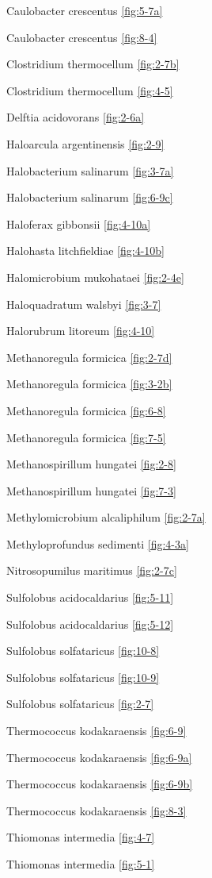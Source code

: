 \documentclass[]{tufte-book}
\begin{document}
Caulobacter crescentus \ref{fig:5-7a}

Caulobacter crescentus \ref{fig:8-4}

Clostridium thermocellum \ref{fig:2-7b}

Clostridium thermocellum \ref{fig:4-5}

Delftia acidovorans \ref{fig:2-6a}

Haloarcula argentinensis \ref{fig:2-9}

Halobacterium salinarum \ref{fig:3-7a}

Halobacterium salinarum \ref{fig:6-9c}

Haloferax gibbonsii \ref{fig:4-10a}

Halohasta litchfieldiae \ref{fig:4-10b}

Halomicrobium mukohataei \ref{fig:2-4e}

Haloquadratum walsbyi \ref{fig:3-7}

Halorubrum litoreum \ref{fig:4-10}

Methanoregula formicica \ref{fig:2-7d}

Methanoregula formicica \ref{fig:3-2b}

Methanoregula formicica \ref{fig:6-8}

Methanoregula formicica \ref{fig:7-5}

Methanospirillum hungatei \ref{fig:2-8}

Methanospirillum hungatei \ref{fig:7-3}

Methylomicrobium alcaliphilum \ref{fig:2-7a}

Methyloprofundus sedimenti \ref{fig:4-3a}

Nitrosopumilus maritimus \ref{fig:2-7c}

Sulfolobus acidocaldarius \ref{fig:5-11}

Sulfolobus acidocaldarius \ref{fig:5-12}

Sulfolobus solfataricus \ref{fig:10-8}

Sulfolobus solfataricus \ref{fig:10-9}

Sulfolobus solfataricus \ref{fig:2-7}

Thermococcus kodakaraensis \ref{fig:6-9}

Thermococcus kodakaraensis \ref{fig:6-9a}

Thermococcus kodakaraensis \ref{fig:6-9b}

Thermococcus kodakaraensis \ref{fig:8-3}

Thiomonas intermedia \ref{fig:4-7}

Thiomonas intermedia \ref{fig:5-1}
\end{document}
